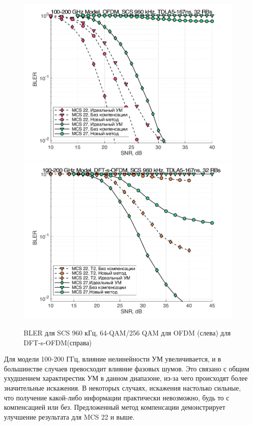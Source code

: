 \begin{figure}[h!]
    \centering
    \includegraphics[width=0.49\linewidth]{figs/res/ofdm/OFDM_SubTHz_SCS960_MCS22_27.png}
    \includegraphics[width=0.49\linewidth]{figs/res/dftsofdm/DFT-s-OFDM_SubTHz_SCS960_MCS22_27.png}
    \caption{BLER для SCS 960 кГц, 64-QAM/256 QAM для OFDM (слева) для DFT-s-OFDM(справа)}
    \label{fig:res100200_scs960}
\end{figure}
Для модели 100-200 ГГц, влияние нелинейности УМ увеличивается, и в
большинстве случаев превосходит влияние фазовых шумов. Это связано с общим
ухудшением характирестик УМ в данном диапазоне, из-за чего происходят более
значительные искажения. В некоторых случаях, искажения настолько сильные,
что получение какой-либо информации практически невозможно, будь то с
компенсацией или без. Предложенный метод компенсации демонстрирует
улучшение результата для MCS 22 и выше.



